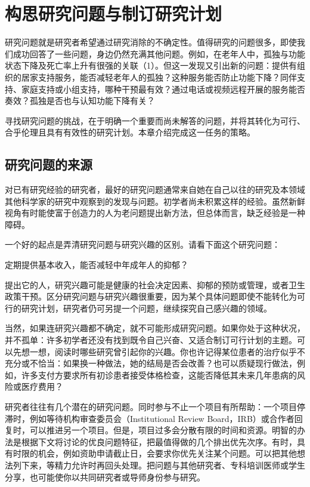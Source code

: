\chapter{构思研究问题与制订研究计划}
研究问题就是研究者希望通过研究消除的不确定性。值得研究的问题很多，即使我们成功回答了一些问题，身边仍然充满其他问题。例如，在老年人中，孤独与功能状态下降及死亡率上升有很强的关联（1）。但这一发现又引出新的问题：提供有组织的居家支持服务，能否减轻老年人的孤独？这种服务能否防止功能下降？同伴支持、家庭支持或小组支持，哪种干预最有效？通过电话或视频远程开展的服务能否奏效？孤独是否也与认知功能下降有关？

寻找研究问题的挑战，在于明确一个重要而尚未解答的问题，并将其转化为可行、合乎伦理且具有有效性的研究计划。本章介绍完成这一任务的策略。

\section{研究问题的来源}
对已有研究经验的研究者，最好的研究问题通常来自她在自己以往的研究及本领域其他科学家的研究中观察到的发现与问题。初学者尚未积累这样的经验。虽然新鲜视角有时能使富于创造力的人为老问题提出新方法，但总体而言，缺乏经验是一种障碍。

一个好的起点是弄清研究问题与研究兴趣的区别。请看下面这个研究问题：
\begin{studyquote}定期提供基本收入，能否减轻中年成年人的抑郁？\end{studyquote}
提出它的人，研究兴趣可能是健康的社会决定因素、抑郁的预防或管理，或者卫生政策干预。区分研究问题与研究兴趣很重要，因为某个具体问题即使不能转化为可行的研究计划，研究者仍可另提一个问题，继续探究自己感兴趣的领域。

当然，如果连研究兴趣都不确定，就不可能形成研究问题。如果你处于这种状况，并不孤单：许多初学者还没有找到既令自己兴奋、又适合制订可行计划的主题。可以先想一想，阅读时哪些研究曾引起你的兴趣。你也许记得某位患者的治疗似乎不充分或不恰当：如果换一种做法，她的结局是否会改善？也可以质疑现行做法，例如，许多支付方要求所有初诊患者接受体格检查，这能否降低其未来几年患病的风险或医疗费用？

研究者往往有几个潜在的研究问题。同时参与不止一个项目有所帮助：一个项目停滞时，例如等待机构审查委员会（Institutional Review Board，IRB）或合作者回复时，可以推进另一个项目。但是，项目过多会分散有限的时间和资源。明智的办法是根据下文将讨论的优良问题特征，把最值得做的几个排出优先次序。有时，具有时限的机会，例如资助申请截止日，会要求你优先关注某个问题。可以把其他想法列下来，等精力允许时再回头处理。把问题与其他研究者、专科培训医师或学生分享，也可能使你以共同研究者或导师身份参与研究。

